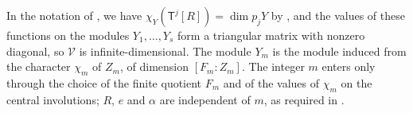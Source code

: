\begin{remark}
  \label{rem:selection-visible-rank}
  In the notation of , we have
  ${\chi_Y(\mathsf{T}^j[R])=\dim p_jY}$ by ,
  and the values of these functions on the
  modules $Y_1,\dots,Y_s$ form a triangular matrix with nonzero diagonal, so
  $\mathcal V$ is infinite-dimensional. The module $Y_m$ is the module
  induced from the character $\chi_m$ of $Z_m$, of dimension $[F_m:Z_m]$. The
  integer $m$ enters only through the
  choice of the finite quotient $F_m$ and of the values of $\chi_m$ on the
  central involutions; $R$, $e$ and $\alpha$ are independent of $m$, as required
  in .
\end{remark}
